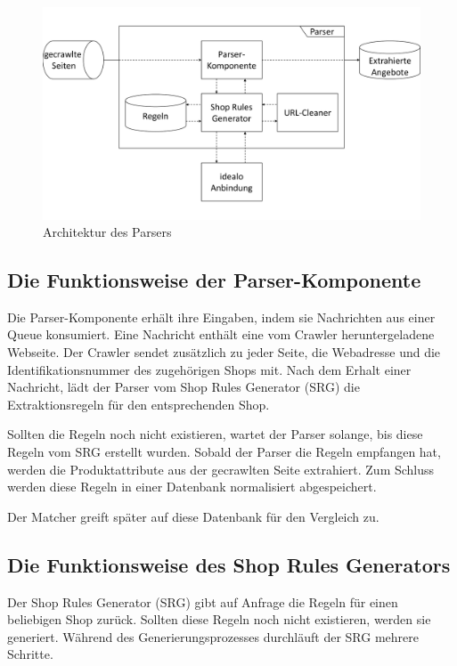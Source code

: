 \begin{figure}[H]
    \centering
    \includegraphics[width=13cm, trim=0 1.7cm 0 1.7cm, clip]{resources/Architektur-Parser.pdf}
    \caption{Architektur des Parsers}
    \label{abb:architektur-parser}
\end{figure}

\subsection{Die Funktionsweise der Parser-Komponente}
\label{subsec:funktionsweise-parser}

Die Parser-Komponente erhält ihre Eingaben, indem sie Nachrichten aus einer Queue konsumiert.
Eine Nachricht enthält eine vom Crawler heruntergeladene Webseite.
Der Crawler sendet zusätzlich zu jeder Seite, die Webadresse und die Identifikationsnummer des zugehörigen Shops mit.
Nach dem Erhalt einer Nachricht, lädt der Parser vom Shop Rules Generator (SRG) die Extraktionsregeln für den
entsprechenden Shop.

Sollten die Regeln noch nicht existieren, wartet der Parser solange, bis diese Regeln vom SRG erstellt wurden.
Sobald der Parser die Regeln empfangen hat, werden die Produktattribute aus der gecrawlten Seite extrahiert.
Zum Schluss werden diese Regeln in einer Datenbank normalisiert abgespeichert.

Der Matcher greift später auf diese Datenbank für den Vergleich zu.

\subsection{Die Funktionsweise des Shop Rules Generators}
\label{subsec:funktionsweise-srg}

Der Shop Rules Generator (SRG) gibt auf Anfrage die Regeln für einen beliebigen Shop zurück.
Sollten diese Regeln noch nicht existieren, werden sie generiert.
Während des Generierungsprozesses durchläuft der SRG mehrere Schritte.

